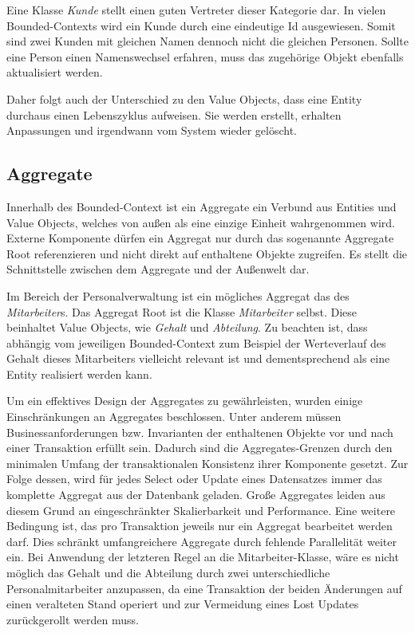 Eine Klasse \emph{Kunde} stellt einen guten Vertreter dieser Kategorie dar. In vielen Bounded-Contexts wird ein Kunde durch eine eindeutige Id ausgewiesen. Somit sind zwei Kunden mit gleichen Namen dennoch nicht die gleichen Personen. Sollte eine Person einen Namenswechsel erfahren, muss das zugehörige Objekt ebenfalls aktualisiert werden.

Daher folgt auch der Unterschied zu den Value Objects, dass eine Entity durchaus einen Lebenszyklus aufweisen. Sie werden erstellt, erhalten Anpassungen und irgendwann vom System wieder gelöscht. 


\subsection{Aggregate}

Innerhalb des Bounded-Context ist ein Aggregate ein Verbund aus Entities und Value Objects, welches von außen als eine einzige Einheit wahrgenommen wird. Externe Komponente dürfen ein Aggregat nur durch das sogenannte Aggregate Root referenzieren und nicht direkt auf enthaltene Objekte zugreifen. Es stellt die Schnittstelle zwischen dem Aggregate und der Außenwelt dar. 

Im Bereich der Personalverwaltung ist ein mögliches Aggregat das des \emph{Mitarbeiter}s. Das Aggregat Root ist die Klasse \emph{Mitarbeiter} selbst. Diese beinhaltet Value Objects, wie \emph{Gehalt} und \emph{Abteilung}. Zu beachten ist, dass abhängig vom jeweiligen Bounded-Context zum Beispiel der Werteverlauf des Gehalt dieses Mitarbeiters vielleicht relevant ist und dementsprechend als eine Entity realisiert werden kann.

Um ein effektives Design der Aggregates zu gewährleisten, wurden einige Einschränkungen an Aggregates beschlossen. Unter anderem müssen Businessanforderungen bzw. Invarianten der enthaltenen Objekte vor und nach einer Transaktion erfüllt sein. Dadurch sind die Aggregates-Grenzen durch den minimalen Umfang der transaktionalen Konsistenz ihrer Komponente gesetzt. Zur Folge dessen, wird für jedes Select oder Update eines Datensatzes immer das komplette Aggregat aus der Datenbank geladen. Große Aggregates leiden aus diesem Grund an eingeschränkter Skalierbarkeit und Performance. Eine weitere Bedingung ist, das pro Transaktion jeweils nur ein Aggregat bearbeitet werden darf. Dies schränkt umfangreichere Aggregate durch fehlende Parallelität weiter ein. Bei Anwendung der letzteren Regel an die Mitarbeiter-Klasse, wäre es nicht möglich das Gehalt und die Abteilung durch zwei unterschiedliche Personalmitarbeiter anzupassen, da eine Transaktion der beiden Änderungen auf einen veralteten Stand operiert und zur Vermeidung eines Lost Updates zurückgerollt werden muss. 

